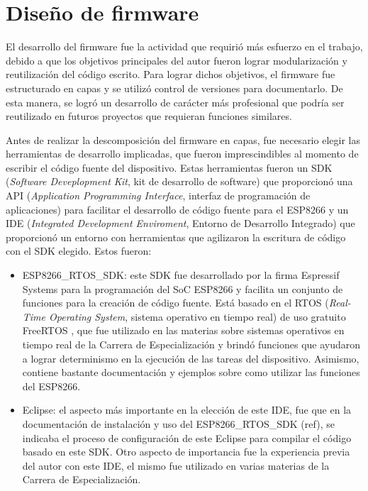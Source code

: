 

\section{Diseño de firmware}

El desarrollo del firmware fue la actividad que requirió más esfuerzo en el trabajo, debido a que los objetivos principales del autor fueron lograr modularización y reutilización del código escrito. Para lograr dichos objetivos, el firmware fue estructurado en capas y se utilizó control de versiones para documentarlo. De esta manera, se logró un desarrollo de carácter más profesional que podría ser reutilizado en futuros proyectos que requieran funciones similares.

Antes de realizar la descomposición del firmware en capas, fue necesario elegir las herramientas de desarrollo implicadas, que fueron imprescindibles al momento de escribir el código fuente del dispositivo. Estas herramientas fueron un SDK (\textit{Software Deveplopment Kit}, kit de desarrollo de software) que proporcionó una API (\textit{Application Programming Interface}, interfaz de programación de aplicaciones) para facilitar el desarrollo de código fuente para el ESP8266 y un IDE (\textit{Integrated Development Enviroment}, Entorno de Desarrollo Integrado) que proporcionó un entorno con herramientas que agilizaron la escritura de código con el SDK elegido. Estos fueron:

\begin{itemize}
	\item ESP8266\_RTOS\_SDK: este SDK fue desarrollado por la firma Espressif Systems para la programación del SoC ESP8266 y facilita un conjunto de funciones para la creación de código fuente. Está basado en el RTOS (\textit{Real-Time Operating System}, sistema operativo en tiempo real) de uso gratuito FreeRTOS \citep{WEBSITE:18}, que fue utilizado en las materias sobre sistemas operativos en tiempo real de la Carrera de Especialización y brindó funciones que ayudaron a lograr determinismo en la ejecución de las tareas del dispositivo. Asimismo, contiene bastante documentación y ejemplos sobre como utilizar las funciones del ESP8266.
	\item Eclipse: el aspecto más importante en la elección de este IDE, fue que en la documentación de instalación y uso del ESP8266\_RTOS\_SDK (ref), se indicaba el proceso de configuración de este Eclipse para compilar el código basado en este SDK. Otro aspecto de importancia fue la experiencia previa del autor con este IDE, el mismo fue utilizado en varias materias de la Carrera de Especialización.
\end{itemize}

